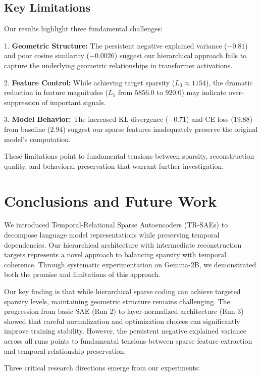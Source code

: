 \documentclass{article} %
\begin{document}
\subsection{Key Limitations}
Our results highlight three fundamental challenges:

1. \textbf{Geometric Structure:} The persistent negative explained variance ($-0.81$) and poor cosine similarity ($-0.0026$) suggest our hierarchical approach fails to capture the underlying geometric relationships in transformer activations.

2. \textbf{Feature Control:} While achieving target sparsity ($L_0 \approx 1154$), the dramatic reduction in feature magnitudes ($L_1$ from $5856.0$ to $920.0$) may indicate over-suppression of important signals.

3. \textbf{Model Behavior:} The increased KL divergence ($-0.71$) and CE loss ($19.88$) from baseline ($2.94$) suggest our sparse features inadequately preserve the original model's computation.

These limitations point to fundamental tensions between sparsity, reconstruction quality, and behavioral preservation that warrant further investigation.

\section{Conclusions and Future Work}
\label{sec:conclusion}

We introduced Temporal-Relational Sparse Autoencoders (TR-SAEs) to decompose language model representations while preserving temporal dependencies. Our hierarchical architecture with intermediate reconstruction targets represents a novel approach to balancing sparsity with temporal coherence. Through systematic experimentation on Gemma-2B, we demonstrated both the promise and limitations of this approach.

Our key finding is that while hierarchical sparse coding can achieve targeted sparsity levels, maintaining geometric structure remains challenging. The progression from basic SAE (Run 2) to layer-normalized architecture (Run 3) showed that careful normalization and optimization choices can significantly improve training stability. However, the persistent negative explained variance across all runs points to fundamental tensions between sparse feature extraction and temporal relationship preservation.

Three critical research directions emerge from our experiments:
\end{document}

